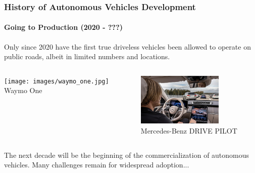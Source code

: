\begin{frame}
\frametitle{History of Autonomous Vehicles Development}
\framesubtitle{Going to Production (2020 - ???)}
Only since 2020 have the first true driveless vehicles been allowed to operate
on public roads, albeit in limited numbers and locations.\\
\begin{columns}[]
    \begin{column}{0.5\textwidth}
        \centering
        \texttt{[image: images/waymo\_one.jpg]} \\
        \footnotesize Waymo One\footnotemark[1]
    \end{column}
    \begin{column}{0.5\textwidth}
        \centering
        \includegraphics[height=2.5cm]{images/mercedes-level-3.jpg} \\
        \footnotesize Mercedes-Benz DRIVE PILOT \cite{MercedesLevel3}
    \end{column}
\end{columns}
\begin{block}{}
The next decade will be the beginning of the commercialization of autonomous
vehicles. Many challenges remain for widespread adoption...
\end{block}
\end{frame}